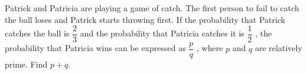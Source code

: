 Patrick and Patricia are playing a game of catch. The first person to fail to catch the ball loses and Patrick starts throwing first. If the probability that Patrick catches the ball is $\dfrac{2}{3}$ and the probability that Patricia catches it is $\dfrac{1}{2}$ , the probability that Patricia wins can be expressed as $\dfrac{p}{q}$ , where $p$ and $q$ are relatively prime. Find $p + q$.
